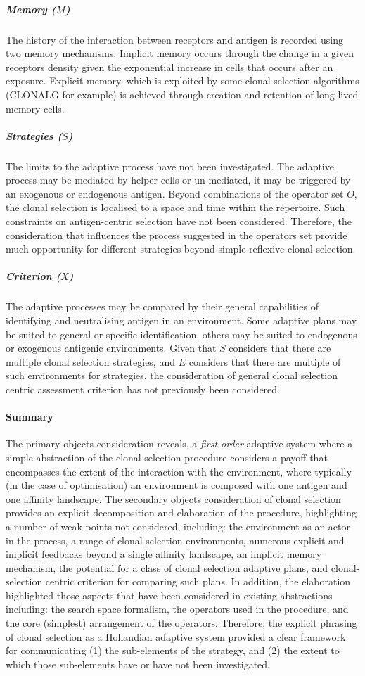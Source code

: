 \subparagraph{Memory ($M$)} The history of the interaction between receptors and antigen is recorded using two memory mechanisms. Implicit memory occurs through the change in a given receptors density given the exponential increase in cells that occurs after an exposure. Explicit memory, which is exploited by some clonal selection algorithms (CLONALG for example) is achieved through creation and retention of long-lived memory cells. 

\subparagraph{Strategies ($S$)} The limits to the adaptive process have not been investigated. The adaptive process may be mediated by helper cells or un-mediated, it may be triggered by an exogenous or endogenous antigen. Beyond combinations of the operator set $O$, the clonal selection is localised to a space and time within the repertoire. Such constraints on antigen-centric selection have not been considered. Therefore, the consideration that influences the process suggested in the operators set provide much opportunity for different strategies beyond simple reflexive clonal selection.

\subparagraph{Criterion ($X$)} The adaptive processes may be compared by their general capabilities of identifying and neutralising antigen in an environment. Some adaptive plans may be suited to general or specific identification, others may be suited to endogenous or exogenous antigenic environments. Given that $S$ considers that there are multiple clonal selection strategies, and $E$ considers that there are multiple of such environments for strategies, the consideration of general clonal selection centric assessment criterion has not previously been considered.

\paragraph{Summary}
The primary objects consideration reveals, a \emph{first-order} adaptive system where a simple abstraction of the clonal selection procedure considers a payoff that encompasses the extent of the interaction with the environment, where typically (in the case of optimisation) an environment is composed with one antigen and one affinity landscape. The secondary objects consideration of clonal selection provides an explicit decomposition and elaboration of the procedure, highlighting a number of weak points not considered, including: the environment as an actor in the process, a range of clonal selection environments, numerous explicit and implicit feedbacks beyond a single affinity landscape, an implicit memory mechanism, the potential for a class of clonal selection adaptive plans, and clonal-selection centric criterion for comparing such plans. In addition, the elaboration highlighted those aspects that have been considered in existing abstractions including: the search space formalism, the operators used in the procedure, and the core (simplest) arrangement of the operators. Therefore, the explicit phrasing of clonal selection as a Hollandian adaptive system provided a clear framework for communicating (1) the sub-elements of the strategy, and (2) the extent to which those sub-elements have or have not been investigated. 


